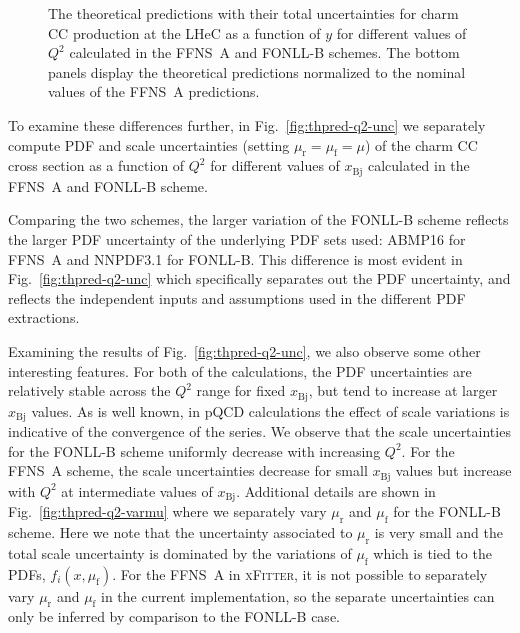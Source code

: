 \documentclass[pdftex,twocolumn,epjc3]{svjour3}          %
\newcommand{\xfitter} {\textsc{xFitter}\xspace}
\newcommand{\xbj}{\ensuremath{x_{\text{Bj}}}\xspace}
\newcommand{\fonll} {{FONLL-B}\xspace}
\newcommand{\ffns} {{FFNS~A}\xspace}
\begin{document}
\begin{figure}
    \centering
    \caption{The theoretical predictions with their total
      uncertainties for charm CC production at the LHeC as a function
      of $y$ for different values of $Q^2$ calculated in the \ffns and
      \fonll schemes. The bottom panels display the theoretical
      predictions normalized to the nominal values of the \ffns
      predictions.}
    \label{fig:thpred-y}
\end{figure}

To examine these differences further, in Fig.~\ref{fig:thpred-q2-unc}
we separately compute PDF and scale uncertainties (setting
$\mu_\mathrm{r}=\mu_\mathrm{f}=\mu$) of the charm CC cross section as
a function of $Q^2$ for different values of \xbj calculated in the
\ffns and \fonll scheme.
%
%
%
%

Comparing the two schemes, the larger variation of the \fonll scheme
reflects the larger PDF uncertainty of the underlying PDF sets used:
ABMP16 for \ffns and NNPDF3.1 for \fonll.
%
This difference is most evident in Fig.~\ref{fig:thpred-q2-unc} which
specifically separates out the PDF uncertainty, and reflects the
independent inputs and assumptions used in the different PDF
extractions.

Examining the results of Fig.~\ref{fig:thpred-q2-unc}, we also observe
some other interesting features.
%
For both of the calculations, the PDF uncertainties are relatively stable
across the  $Q^2$ range for fixed \xbj, but tend to increase at larger \xbj values.
%
As is well known, in pQCD calculations the effect of scale variations
is indicative of the convergence of the series.
%
We observe that the scale uncertainties for the \fonll scheme
uniformly decrease with increasing $Q^2$.
%
For the \ffns scheme, the scale uncertainties decrease for small \xbj
values but increase with $Q^2$ at intermediate values of \xbj.
%
Additional details are shown in Fig.~\ref{fig:thpred-q2-varmu} where
we separately vary $\mu_\mathrm{r}$ and $\mu_\mathrm{f}$ for the
\fonll scheme. Here we note that the uncertainty associated to
$\mu_\mathrm{r}$ is very small and the total scale uncertainty is
dominated by the variations of $\mu_\mathrm{f}$ which is tied to the
PDFs, $f_i(x,\mu_\mathrm{f})$.
%
For the \ffns in \xfitter, it is not possible to separately vary
$\mu_\mathrm{r}$ and $\mu_\mathrm{f}$ in the current implementation,
so the separate uncertainties can only be inferred by comparison to
the \fonll case.
\end{document}
